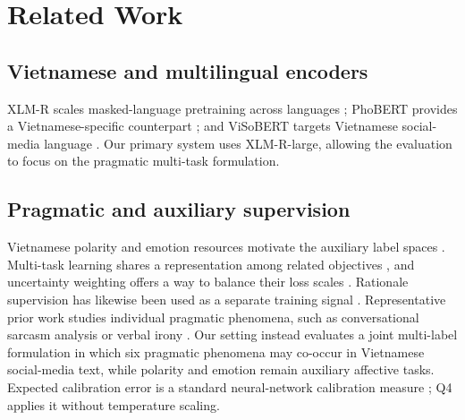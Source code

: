 \section{Related Work}

\subsection{Vietnamese and multilingual encoders}
XLM-R scales masked-language pretraining across languages \citep{conneau-etal-2020-unsupervised}; PhoBERT provides a Vietnamese-specific counterpart \citep{nguyen-tuan-nguyen-2020-phobert}; and ViSoBERT targets Vietnamese social-media language \citep{nguyen-etal-2023-visobert}. Our primary system uses XLM-R-large, allowing the evaluation to focus on the pragmatic multi-task formulation.

\subsection{Pragmatic and auxiliary supervision}
Vietnamese polarity and emotion resources motivate the auxiliary label spaces \citep{vannguyen2018uitvsfc,ho2019emotion}. Multi-task learning shares a representation among related objectives \citep{caruana1997multitask}, and uncertainty weighting offers a way to balance their loss scales \citep{kendall2018multitask}. Rationale supervision has likewise been used as a separate training signal \citep{lei-etal-2016-rationalizing,hsieh-etal-2023-distilling}. Representative prior work studies individual pragmatic phenomena, such as conversational sarcasm analysis \citep{ghosh-etal-2018-sarcasm} or verbal irony \citep{burgers-etal-2011}. Our setting instead evaluates a joint multi-label formulation in which six pragmatic phenomena may co-occur in Vietnamese social-media text, while polarity and emotion remain auxiliary affective tasks. Expected calibration error is a standard neural-network calibration measure \citep{guo2017calibration}; Q4 applies it without temperature scaling.
